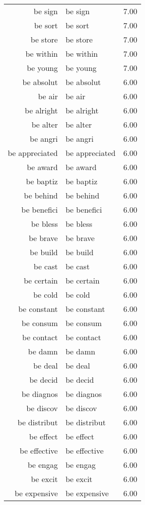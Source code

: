 \begin{table}[ht]
\begin{tabular}{rlr}
  be sign & be sign & 7.00 \\ 
  be sort & be sort & 7.00 \\ 
  be store & be store & 7.00 \\ 
  be within & be within & 7.00 \\ 
  be young & be young & 7.00 \\ 
  be absolut & be absolut & 6.00 \\ 
  be air & be air & 6.00 \\ 
  be alright & be alright & 6.00 \\ 
  be alter & be alter & 6.00 \\ 
  be angri & be angri & 6.00 \\ 
  be appreciated & be appreciated & 6.00 \\ 
  be award & be award & 6.00 \\ 
  be baptiz & be baptiz & 6.00 \\ 
  be behind & be behind & 6.00 \\ 
  be benefici & be benefici & 6.00 \\ 
  be bless & be bless & 6.00 \\ 
  be brave & be brave & 6.00 \\ 
  be build & be build & 6.00 \\ 
  be cast & be cast & 6.00 \\ 
  be certain & be certain & 6.00 \\ 
  be cold & be cold & 6.00 \\ 
  be constant & be constant & 6.00 \\ 
  be consum & be consum & 6.00 \\ 
  be contact & be contact & 6.00 \\ 
  be damn & be damn & 6.00 \\ 
  be deal & be deal & 6.00 \\ 
  be decid & be decid & 6.00 \\ 
  be diagnos & be diagnos & 6.00 \\ 
  be discov & be discov & 6.00 \\ 
  be distribut & be distribut & 6.00 \\ 
  be effect & be effect & 6.00 \\ 
  be effective & be effective & 6.00 \\ 
  be engag & be engag & 6.00 \\ 
  be excit & be excit & 6.00 \\ 
  be expensive & be expensive & 6.00 \\ 

\end{tabular}
\end{table}

